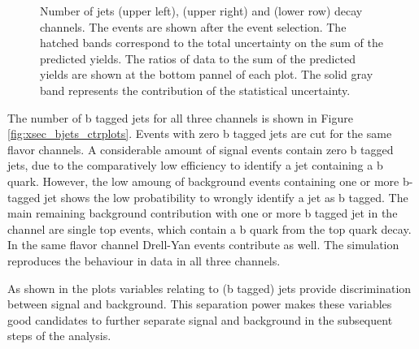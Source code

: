 \begin{figure}[htbp!]
\begin{center}
    \caption{Number of jets \emu (upper left), \mumu (upper right) and \ee (lower row) decay channels.
        The events are shown after the
        event selection.  The hatched
        bands correspond to the total uncertainty on the sum of the
        predicted yields. 
        The ratios of data to the sum of the predicted yields are
        shown at the bottom pannel of each plot. The solid gray band
        represents the contribution of the statistical uncertainty.}  
       \label{fig:xsec_jets_ctrplots}
  \end{center}
\end{figure}

The number of b tagged jets for all three channels is shown in Figure \ref{fig:xsec_bjets_ctrplots}.
Events with zero b tagged jets are cut for the same flavor channels.
A considerable amount of \ttbar signal events contain zero b tagged jets, due to the comparatively low efficiency to identify a jet containing a b quark.
However, the low amoung of background events containing one or more b-tagged jet shows the low probatibility to wrongly identify a jet as b tagged.
The main remaining background contribution with one or more b tagged jet in the \emu channel are single top events, which contain a b quark from the top quark decay.
In the same flavor channel Drell-Yan events contribute as well.
The simulation reproduces the behaviour in data in all three channels.

As shown in the plots variables relating to (b tagged) jets provide discrimination between signal and background. This separation power makes these variables good candidates to 
further separate signal and background in the subsequent steps of the analysis.

